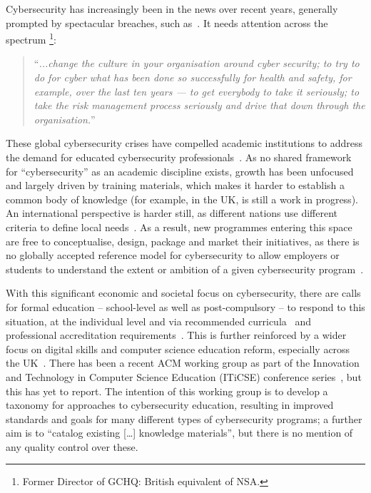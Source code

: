 \documentclass[conference]{IEEEtran}
\begin{document}
Cybersecurity has increasingly been in the news over recent years, generally prompted by spectacular breaches, such as~\cite{BritishAirways2018a}. It needs attention across the spectrum \cite{Hannigan2019a}\footnote{Former Director of GCHQ: British equivalent of NSA.}:
\begin{quote}
``{\emph{...change the culture in your organisation around cyber security; to try to do for cyber what has been done so successfully for health and safety, for example, over the last ten years --- to get everybody to take it seriously; to take the risk management process seriously and drive that down through the organisation.}}''
\end{quote}
\noindent
These global cybersecurity crises have compelled academic institutions to address the demand for educated cybersecurity professionals~\cite{McGettrick2013}. As no shared framework for ``cybersecurity'' as an academic discipline exists, growth has been unfocused and largely driven by training materials, which makes it harder to establish a common body of knowledge (for example, in the UK, \cite{Bristol2019a} is still a work in progress). An international perspective is harder still, as different nations use different criteria to define local needs~\cite{schneider2013}. As a result, new programmes entering this space are free to conceptualise, design, package and market their initiatives, as there is no globally accepted reference model for cybersecurity to allow employers or students to understand the extent or ambition of a given cybersecurity program~\cite{conklin-et-al:2014,Parrishetal2018a}.

With this significant economic and societal focus on cybersecurity, there are calls for formal education -- school-level as well as post-compulsory -- to respond to this situation, at the individual level and via recommended curricula~\cite{mcgettrick-et-al:sigcse2014,ACM2017b} and professional accreditation requirements~\cite{BCS2018a}. This is further reinforced by a wider focus on digital skills and computer science education reform, especially across the UK~\cite{brown-et-al:toce2014,murphy-et-al:programming2017,tryfonas+crick:petra2018}. There has been a recent ACM working group as part of the Innovation and Technology in Computer Science Education (ITiCSE) conference series~\cite{Parrishetal2018a}, but this has yet to report. The intention of this working group is to develop a taxonomy for approaches to cybersecurity education, resulting in improved standards and goals for many different types of cybersecurity programs; a further aim is to ``catalog existing [\dots] knowledge materials'', but there is no mention of any quality control over these.
\end{document}
